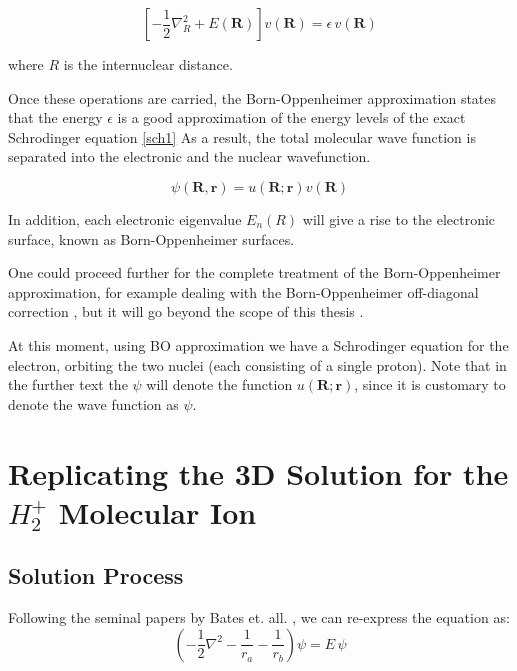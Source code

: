 \begin{equation}\label{v}
\left[ -\frac{1}{2}\nabla_R^2 + E(\mathbf{R}) \right] v( \mathbf{R} ) = \epsilon\,v( \mathbf{R} )
\end{equation}

where $ R $ is the internuclear distance.

Once these operations are carried, the Born-Oppenheimer approximation states that the energy $ \epsilon $ is a good approximation of the energy levels of the exact Schrodinger equation \eqref{sch1}
 As a result, the total molecular wave function is separated into the electronic and the nuclear wavefunction.

\begin{equation}
\psi(\mathbf{R},\mathbf{r}) =  u(\mathbf{R};\mathbf{r})  v( \mathbf{R} )
\end{equation}

In addition, each electronic eigenvalue $ E_n(R) $ will give a rise to the electronic surface, known as Born-Oppenheimer surfaces. 

One could proceed further for the complete treatment of the Born-Oppenheimer approximation, for example dealing with the Born-Oppenheimer off-diagonal correction \cite{BOApprox2}, but it will go beyond the scope of this thesis . 

At this moment, using BO approximation we have a Schrodinger equation for the electron, orbiting the two nuclei (each consisting of a single proton). Note that in the further text the $ \psi $ will denote the function $  u(\mathbf{R}; \mathbf{r} ) $, since it is customary to denote the wave function as $ \psi $. 

\section{Replicating the 3D Solution for the \texorpdfstring{$ H_2^{+} $}{ $H_2^+ $ } Molecular Ion }

\subsection{Solution Process}

Following the seminal papers by Bates et. all.  \cite{Bates1}\cite{Bates2}, we can re-express the equation  as:
\begin{equation}\label{eqPartial3D}
\left(-\frac{1}{2}\nabla^2-\frac{1}{r_a}-\frac{1}{r_b}\right)\psi = E\,\psi
\end{equation}

